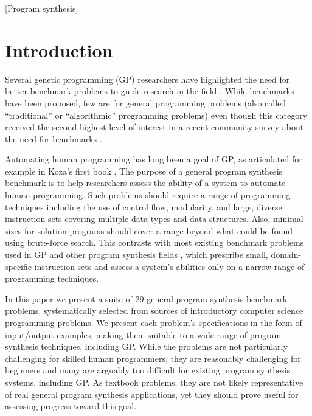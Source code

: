 \documentclass{sig-alternate}
\begin{document}
[Program synthesis]




\section{Introduction}

Several genetic programming (GP) researchers have highlighted the need for better benchmark problems to guide research in the field \cite{McDermott:2012:GECCO, White:2013:BGB:2441218.2441242, Woodward:2014:GECCOcomp}. While benchmarks have been proposed, few are for general programming problems (also called ``traditional'' or ``algorithmic'' programming problems) even though this category received the second highest level of interest in a recent community survey about the need for benchmarks \cite{White:2013:BGB:2441218.2441242}. 

Automating human programming has long been a goal of GP, as articulated for example in Koza's first book \cite{koza:book}. The purpose of a general program synthesis benchmark is to help researchers assess the ability of a system to automate human programming. Such problems should require a range of programming techniques including the use of control flow, modularity, and large, diverse instruction sets covering multiple data types and data structures. Also, minimal sizes for solution programs should cover a range beyond what could be found using brute-force search. This contrasts with most existing benchmark problems used in GP and other program synthesis fields \cite{hofmann2009unifying}, which prescribe small, domain-specific instruction sets and assess a system's abilities only on a narrow range of programming techniques.

In this paper we present a suite of $29$ general program synthesis benchmark problems, systematically selected from sources of introductory computer science programming problems. We present each problem's specifications in the form of input/output examples, making them suitable to a wide range of program synthesis techniques, including GP. While the problems are not particularly challenging for skilled human programmers, they are reasonably challenging for beginners and many are arguably too difficult for existing program synthesis systems, including GP. As textbook problems, they are not likely representative of real general program synthesis applications, yet they should prove useful for assessing progress toward this goal.
\end{document}
